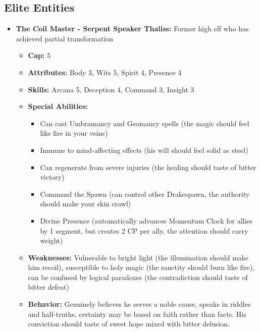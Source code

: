 \documentclass[11pt]{article}
\begin{document}
\begin{itemize}
\subsection{Elite Entities}
\begin{itemize}
\item \textbf{The Coil Master - Serpent Speaker Thaliss:} Former high elf who has achieved partial transformation
  \begin{itemize}
  \item \textbf{Cap:} 5
  \item \textbf{Attributes:} Body 3, Wits 5, Spirit 4, Presence 4
  \item \textbf{Skills:} Arcana 5, Deception 4, Command 3, Insight 3
  \item \textbf{Special Abilities:}
    \begin{itemize}
    \item Can cast Umbramancy and Geomancy spells (the magic should feel like fire in your veins)
    \item Immune to mind-affecting effects (his will should feel solid as steel)
    \item Can regenerate from severe injuries (the healing should taste of bitter victory)
    \item Command the Spawn (can control other Drakespawn, the authority should make your skin crawl)
    \item Divine Presence (automatically advances Momentum Clock for allies by 1 segment, but creates 2 CP per ally, the attention should carry weight)
    \end{itemize}
  \item \textbf{Weaknesses:} Vulnerable to bright light (the illumination should make him recoil), susceptible to holy magic (the sanctity should burn like fire), can be confused by logical paradoxes (the contradiction should taste of bitter defeat)
  \item \textbf{Behavior:} Genuinely believes he serves a noble cause, speaks in riddles and half-truths, certainty may be based on faith rather than facts. His conviction should taste of sweet hope mixed with bitter delusion.

\end{itemize}
\end{itemize}
\end{itemize}
\end{document}
